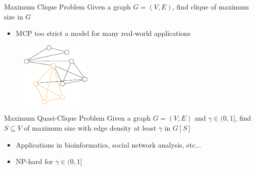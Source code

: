 \documentclass{beamer}
\begin{document}
\begin{frame}{Maximum Clique Problem}
    Given a graph $G = (V,E)$, find clique of maximum size in $G$
    \begin{itemize}
        \item MCP too strict a model for many real-world applications
    \end{itemize}
    \begin{figure}
        \centering
        \includegraphics[width=0.3\textwidth]{graphics/graph1-clique.eps}
    \end{figure}
\end{frame} 

\begin{frame}{Maximum Quasi-Clique Problem}
    Given a graph $G = (V,E)$ and $\gamma \in (0,1]$, find $S \subseteq V$ of maximum size with edge density at least $\gamma$ in $G[S]$
    \begin{itemize}
        \item<1-> Applications in bioinformatics, social network analysis, etc...
        \item<2-> NP-hard for $\gamma \in (0,1]$ \cite{pattillo_maximum_2013}
    \end{itemize}
\end{frame}
\end{document}
